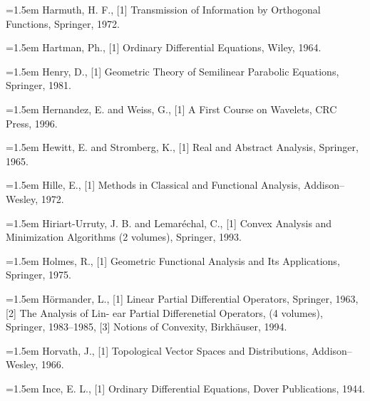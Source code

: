 \noindent\hangindent=1.5em Harmuth, H. F., \hypertarget{ref:Harmuth-1}{[1]} Transmission of Information by Orthogonal Functions, Springer, 1972.\par{}
\noindent\hangindent=1.5em Hartman, Ph., \hypertarget{ref:Hartman-1}{[1]} Ordinary Differential Equations, Wiley, 1964.\par{}
\noindent\hangindent=1.5em Henry, D., \hypertarget{ref:Henry-1}{[1]} Geometric Theory of Semilinear Parabolic Equations, Springer, 1981.\par{}
\noindent\hangindent=1.5em Hernandez, E. and Weiss, G., \hypertarget{ref:HernandezWeiss-1}{[1]} A First Course on Wavelets, CRC Press, 1996.\par{}
\noindent\hangindent=1.5em Hewitt, E. and Stromberg, K., \hypertarget{ref:HewittStromberg-1}{[1]} Real and Abstract Analysis, Springer, 1965.\par{}
\noindent\hangindent=1.5em Hille, E., \hypertarget{ref:Hille-1}{[1]} Methods in Classical and Functional Analysis, Addison--Wesley, 1972.\par{}
\noindent\hangindent=1.5em Hiriart-Urruty, J. B. and Lemaréchal, C., \hypertarget{ref:HiriartUrrutyLemarechal-1}{[1]} Convex Analysis and Minimization Algorithms (2 volumes), Springer, 1993.\par{}
\noindent\hangindent=1.5em Holmes, R., \hypertarget{ref:Holmes-1}{[1]} Geometric Functional Analysis and Its Applications, Springer, 1975.\par{}
\noindent\hangindent=1.5em Hörmander, L., \hypertarget{ref:Hormander-1}{[1]} Linear Partial Differential Operators, Springer, 1963, \hypertarget{ref:Hormander-2}{[2]} The Analysis of Lin- ear Partial Differenetial Operators, (4 volumes), Springer, 1983--1985, \hypertarget{ref:Hormander-3}{[3]} Notions of Convexity, Birkhäuser, 1994.\par{}
\noindent\hangindent=1.5em Horvath, J., \hypertarget{ref:Horvath-1}{[1]} Topological Vector Spaces and Distributions, Addison--Wesley, 1966.\par{}
\noindent\hangindent=1.5em Ince, E. L., \hypertarget{ref:Ince-1}{[1]} Ordinary Differential Equations, Dover Publications, 1944.\par{}
